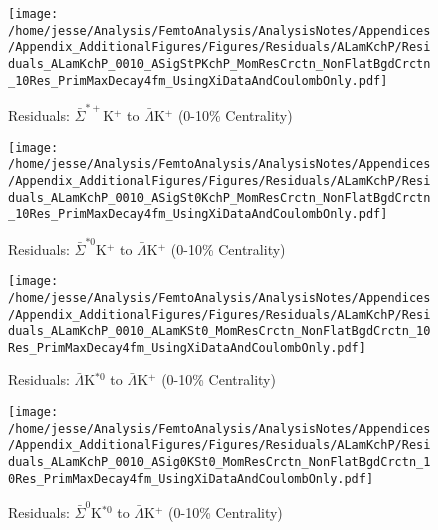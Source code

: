 \documentclass[/home/jesse/Analysis/FemtoAnalysis/AnalysisNotes/AnalysisNoteJBuxton.tex]{subfiles}
\begin{document}
\begin{figure}[h]
  \centering
  \texttt{[image: /home/jesse/Analysis/FemtoAnalysis/AnalysisNotes/Appendices/Appendix\_AdditionalFigures/Figures/Residuals/ALamKchP/Residuals\_ALamKchP\_0010\_ASigStPKchP\_MomResCrctn\_NonFlatBgdCrctn\_10Res\_PrimMaxDecay4fm\_UsingXiDataAndCoulombOnly.pdf]}
  \caption[Residuals: $\bar{\Sigma}^{*+}$K$^{+}$ to $\bar{\Lambda}$K$^{+}$ (0-10\% Centrality)]{Residuals: $\bar{\Sigma}^{*+}$K$^{+}$ to $\bar{\Lambda}$K$^{+}$ (0-10\% Centrality)}
  \label{fig:Res_ALamKchP_0010_ASigStPKchP}
\end{figure}

\begin{figure}[h]
  \centering
  \texttt{[image: /home/jesse/Analysis/FemtoAnalysis/AnalysisNotes/Appendices/Appendix\_AdditionalFigures/Figures/Residuals/ALamKchP/Residuals\_ALamKchP\_0010\_ASigSt0KchP\_MomResCrctn\_NonFlatBgdCrctn\_10Res\_PrimMaxDecay4fm\_UsingXiDataAndCoulombOnly.pdf]}
  \caption[Residuals: $\bar{\Sigma}^{*0}$K$^{+}$ to $\bar{\Lambda}$K$^{+}$ (0-10\% Centrality)]{Residuals: $\bar{\Sigma}^{*0}$K$^{+}$ to $\bar{\Lambda}$K$^{+}$ (0-10\% Centrality)}
  \label{fig:Res_ALamKchP_0010_ASigSt0KchP}
\end{figure}


\begin{figure}[h]
  \centering
  \texttt{[image: /home/jesse/Analysis/FemtoAnalysis/AnalysisNotes/Appendices/Appendix\_AdditionalFigures/Figures/Residuals/ALamKchP/Residuals\_ALamKchP\_0010\_ALamKSt0\_MomResCrctn\_NonFlatBgdCrctn\_10Res\_PrimMaxDecay4fm\_UsingXiDataAndCoulombOnly.pdf]}
  \caption[Residuals: $\bar{\Lambda}$K$^{*0}$ to $\bar{\Lambda}$K$^{+}$ (0-10\% Centrality)]{Residuals: $\bar{\Lambda}$K$^{*0}$ to $\bar{\Lambda}$K$^{+}$ (0-10\% Centrality)}
  \label{fig:Res_ALamKchP_0010_ALamKSt0}
\end{figure}


\begin{figure}[h]
  \centering
  \texttt{[image: /home/jesse/Analysis/FemtoAnalysis/AnalysisNotes/Appendices/Appendix\_AdditionalFigures/Figures/Residuals/ALamKchP/Residuals\_ALamKchP\_0010\_ASig0KSt0\_MomResCrctn\_NonFlatBgdCrctn\_10Res\_PrimMaxDecay4fm\_UsingXiDataAndCoulombOnly.pdf]}
  \caption[Residuals: $\bar{\Sigma}^{0}$K$^{*0}$ to $\bar{\Lambda}$K$^{+}$ (0-10\% Centrality)]{Residuals: $\bar{\Sigma}^{0}$K$^{*0}$ to $\bar{\Lambda}$K$^{+}$ (0-10\% Centrality)}
  \label{fig:Res_ALamKchP_0010_ASig0KSt0}
\end{figure}
\end{document}
